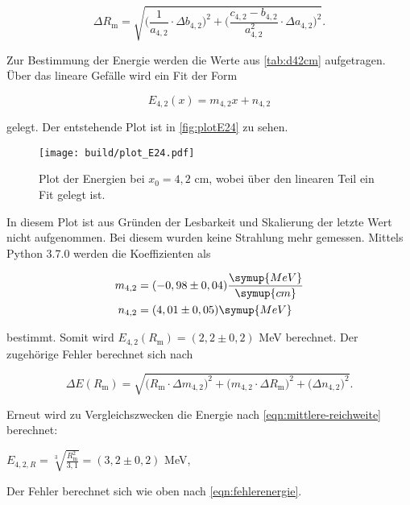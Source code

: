 \begin{equation}
    \Delta R_\text{m} = \sqrt{\bigg(\frac{1}{a_{4,2}} \cdot \Delta b_{4,2} \bigg)^2 + \bigg( \frac{c_{4,2}-b_{4,2}}{a_{4,2}^2} \cdot \Delta a_{4,2} \bigg)^2}.
\end{equation}

Zur Bestimmung der Energie werden die Werte aus \autoref{tab:d42cm} aufgetragen. Über das lineare Gefälle wird ein Fit der Form

\begin{equation}
    E_{4,2}(x) = m_{4,2} x + n_{4,2}
\end{equation}

gelegt. Der entstehende Plot ist in \autoref{fig:plotE24} zu sehen.

\begin{figure}
    \centering
    \texttt{[image: build/plot\_E24.pdf]}
    \caption{Plot der Energien bei $x_0 = 4,2$ cm, wobei über den linearen Teil ein Fit gelegt ist.}
    \label{fig:plotE42}
\end{figure}

In diesem Plot ist aus Gründen der Lesbarkeit und Skalierung der letzte Wert nicht aufgenommen. Bei diesem wurden keine Strahlung mehr gemessen.
Mittels Python 3.7.0 werden die Koeffizienten als

\begin{align}
    m_{4,2} &= (-0,98 \pm 0,04) \frac{\symup{MeV}}{\symup{cm}}\\
    n_{4,2} &= (4,01 \pm 0,05) \symup{MeV}
\end{align}

bestimmt.
Somit wird $E_{4,2}(R_\text{m}) = (2,2 \pm 0,2)$ MeV berechnet. Der zugehörige Fehler berechnet sich nach

\begin{equation}
    \Delta E(R_\text{m}) = \sqrt{\bigg( R_\text{m} \cdot \Delta m_{4,2} \bigg)^2 + \bigg(m_{4,2} \cdot \Delta R_\text{m} \bigg)^2 + \bigg(\Delta n_{4,2} \bigg)^2}.
\end{equation}

Erneut wird zu Vergleichszwecken die Energie nach \eqref{eqn:mittlere-reichweite} berechnet:

\begin{center}
    $E_{4,2,R} = \sqrt[3]{\frac{R_\text{m}^2}{3,1}} = (3,2 \pm 0,2)$ MeV,
\end{center}

Der Fehler berechnet sich wie oben nach \eqref{eqn:fehlerenergie}.


